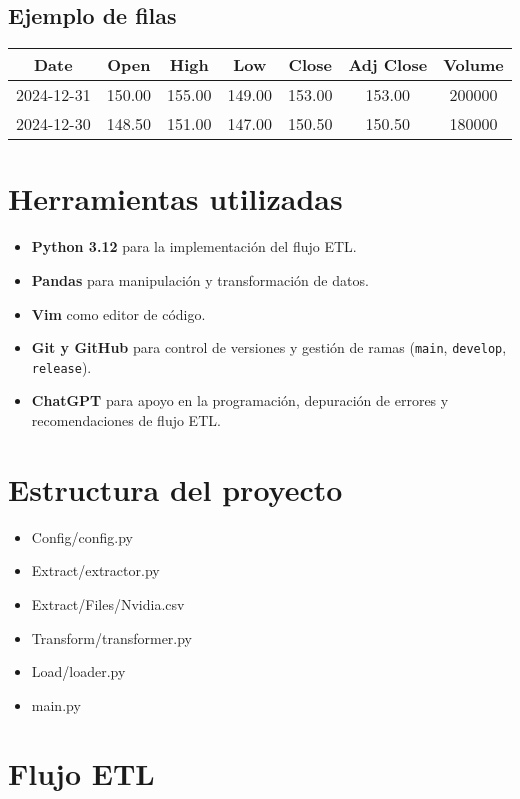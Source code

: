 \documentclass[12pt,a4paper]{article}
\begin{document}
	\subsection{Ejemplo de filas}
	\begin{center}
		\begin{tabular}{|c|c|c|c|c|c|c|}
			\hline
			Date & Open & High & Low & Close & Adj Close & Volume \\
			\hline
			2024-12-31 & 150.00 & 155.00 & 149.00 & 153.00 & 153.00 & 200000 \\
			2024-12-30 & 148.50 & 151.00 & 147.00 & 150.50 & 150.50 & 180000 \\
			\hline
		\end{tabular}
	\end{center}
	
	\section{Herramientas utilizadas}
	\begin{itemize}
		\item \textbf{Python 3.12} para la implementación del flujo ETL.
		\item \textbf{Pandas} para manipulación y transformación de datos.
		\item \textbf{Vim} como editor de código.
		\item \textbf{Git y GitHub} para control de versiones y gestión de ramas (\texttt{main}, \texttt{develop}, \texttt{release}).
		\item \textbf{ChatGPT} para apoyo en la programación, depuración de errores y recomendaciones de flujo ETL.
	\end{itemize}
	
	\section{Estructura del proyecto}
	\begin{itemize}
		\item Config/config.py
		\item Extract/extractor.py
		\item Extract/Files/Nvidia.csv
		\item Transform/transformer.py
		\item Load/loader.py
		\item main.py
	\end{itemize}
	
	\section{Flujo ETL}
\end{document}
